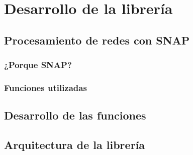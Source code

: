 \section{Desarrollo de la librería}

\subsection{Procesamiento de redes con SNAP}

\subsubsection{¿Porque SNAP?}


\subsubsection{Funciones utilizadas}

\subsection{Desarrollo de las funciones}



\subsection{Arquitectura de la librería}